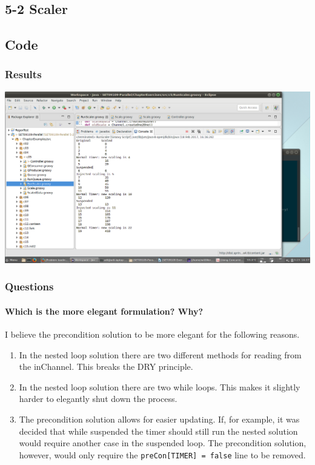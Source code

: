 \subsection{5-2 Scaler}

\subsection{Code}



\subsubsection*{Results}

\includegraphics[width=\textwidth]{img/screenshots/5-2.png}

\subsubsection{Questions}

\paragraph{Which is the more elegant formulation? Why?}

I believe the precondition solution to be more elegant for the following reasons.

\begin{enumerate}
	\item In the nested loop solution there are two different methods for reading from the inChannel.  This breaks the DRY principle.

	\item In the nested loop solution there are two while loops.  This makes it slightly harder to elegantly shut down the process.

	\item The precondition solution allows for easier updating.  If, for example, it was decided that while suspended the timer should still run the nested solution would require another case in the suspended loop.  The precondition solution, however, would only require the \texttt{preCon[TIMER] = false} line to be removed.

\end{enumerate}
